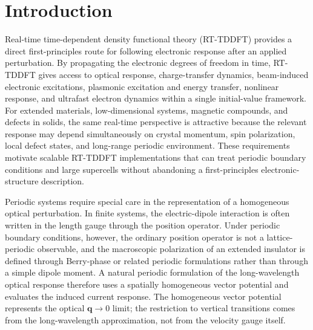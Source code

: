 
\section{Introduction}
\label{sec:intro}

Real-time time-dependent density functional theory (RT-TDDFT) provides
a direct first-principles route for following electronic response after
an applied perturbation.  By propagating the electronic degrees of
freedom in time, RT-TDDFT gives access to optical response,
charge-transfer dynamics, beam-induced electronic excitations,
plasmonic excitation and energy transfer, nonlinear response, and
ultrafast electron dynamics within a single initial-value
framework.\cite{tddft-fundamentals,chem-rev-Li,bertsch-96,lvn-ct-2012,JCTC-2020,tao-2021}
For extended materials, low-dimensional systems, magnetic compounds, and
defects in solids, the same real-time perspective is attractive because
the relevant response may depend simultaneously on crystal momentum,
spin polarization, local defect states, and long-range periodic
environment.  These requirements motivate scalable RT-TDDFT
implementations that can treat periodic boundary conditions and large
supercells without abandoning a first-principles electronic-structure
description.

Periodic systems require special care in the representation of a
homogeneous optical perturbation.  In finite systems, the electric-dipole
interaction is often written in the length gauge through the position
operator.  Under periodic boundary conditions, however, the ordinary
position operator is not a lattice-periodic observable, and the
macroscopic polarization of an extended insulator is defined through
Berry-phase or related periodic formulations rather than through a
simple dipole
moment.\cite{Resta-polarization-1994,KingSmith-Vanderbilt-polarization-1993,periodic-operator}
A natural periodic formulation of the long-wavelength optical response
therefore uses a spatially homogeneous vector potential and evaluates
the induced current response.\cite{Luber-rt-tddft,Hanasaki-2023}
The homogeneous vector potential represents the optical
$\mathbf q\rightarrow0$ limit; the restriction to vertical transitions
comes from the long-wavelength approximation, not from the velocity
gauge itself.

